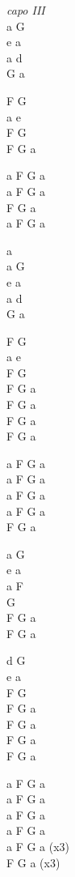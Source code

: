 \begin{chord}
    \begin{tinyTwelve}
    \textit{capo III}\\
    a G\\
    e a\\
    a d\\
    G a

    F G\\
    a e\\
    F G\\
    F G a

    a F G a\\
    a F G a\\
    F G a\\
    a F G a

    a\\
    a G\\
    e a\\
    a d\\
    G a

    F G\\
    a  e\\
    F G\\
    F G a\\
    F G a\\
    F G a\\
    F G a

    a F G a\\
    a F G a\\
    a F G a\\
    a F G a\\
    F G a

a G\\
e a\\
a F\\
G\\
F G a\\
F G a

d G\\
e a\\
F G\\
F G a\\
F G a\\
F G a\\
F G a

a F G a\\
a F G a\\
a F G a\\
a F G a\\
a F G a (x3)\\
F G a (x3)
\end{tinyTwelve}
\end{chord}
